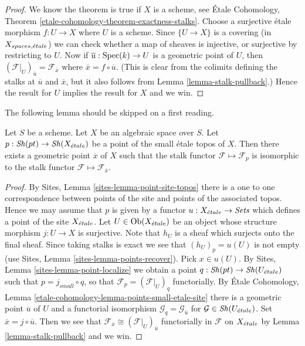 \begin{proof}
We know the theorem is true if $X$ is a scheme, see
\'Etale Cohomology, Theorem \ref{etale-cohomology-theorem-exactness-stalks}.
Choose a surjective \'etale morphism $f : U \to X$ where $U$ is a scheme.
Since $\{U \to X\}$ is a covering (in $X_{spaces, {\acute{e}tale}}$) we can check
whether a map of sheaves is injective, or surjective by restricting
to $U$. Now if $\overline{u} : \mathop{\mathrm{Spec}}(k) \to U$ is a geometric
point of $U$, then
$(\mathcal{F}|_U)_{\overline{u}} = \mathcal{F}_{\overline{x}}$
where $\overline{x} = f \circ \overline{u}$. (This is clear from the
colimits defining the stalks at $\overline{u}$ and $\overline{x}$, but
it also follows from
Lemma \ref{lemma-stalk-pullback}.)
Hence the result for $U$ implies the result for $X$ and we win.
\end{proof}

\noindent
The following lemma should be skipped on a first reading.

\begin{lemma}
\label{lemma-points-small-etale-site}
Let $S$ be a scheme.
Let $X$ be an algebraic space over $S$.
Let $p : \mathop{\mathit{Sh}}\nolimits(pt) \to \mathop{\mathit{Sh}}\nolimits(X_{\acute{e}tale})$
be a point of the small \'etale topos of $X$.
Then there exists a geometric point $\overline{x}$ of $X$
such that the stalk functor $\mathcal{F} \mapsto \mathcal{F}_p$
is isomorphic to the stalk functor
$\mathcal{F} \mapsto \mathcal{F}_{\overline{x}}$.
\end{lemma}

\begin{proof}
By
Sites, Lemma \ref{sites-lemma-point-site-topos}
there is a one to one correspondence between points of the site and points
of the associated topos. Hence we may assume that $p$ is given by
a functor $u : X_{\acute{e}tale} \to \textit{Sets}$ which defines a point
of the site $X_{\acute{e}tale}$.
Let $U \in \mathop{\mathrm{Ob}}\nolimits(X_{\acute{e}tale})$ be an object whose structure morphism
$j : U \to X$ is surjective. Note that $h_U$ is a sheaf
which surjects onto the final sheaf. Since taking stalks is exact
we see that $(h_U)_p = u(U)$ is not empty (use
Sites, Lemma \ref{sites-lemma-points-recover}).
Pick $x \in u(U)$. By
Sites, Lemma \ref{sites-lemma-point-localize}
we obtain a point $q : \mathop{\mathit{Sh}}\nolimits(pt) \to \mathop{\mathit{Sh}}\nolimits(U_{\acute{e}tale})$
such that $p = j_{small} \circ q$, so that
$\mathcal{F}_p = (\mathcal{F}|_U)_q$ functorially.
By
\'Etale Cohomology, Lemma \ref{etale-cohomology-lemma-points-small-etale-site}
there is a geometric point $\overline{u}$ of $U$ and a functorial
isomorphism $\mathcal{G}_q = \mathcal{G}_{\overline{u}}$
for $\mathcal{G} \in \mathop{\mathit{Sh}}\nolimits(U_{\acute{e}tale})$. Set
$\overline{x} = j \circ \overline{u}$. Then we see that
$\mathcal{F}_{\overline{x}} \cong (\mathcal{F}|_U)_{\overline{u}}$
functorially in $\mathcal{F}$ on $X_{\acute{e}tale}$ by
Lemma \ref{lemma-stalk-pullback}
and we win.
\end{proof}





